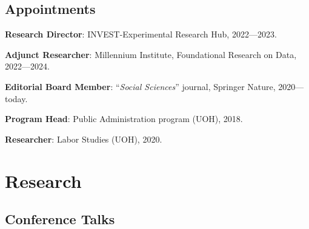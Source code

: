 \documentclass[letterpaper]{article}
\renewenvironment{itemize}{
  \begin{list}{}{
    \setlength{\leftmargin}{1.5em}
  }
}{
  \end{list}
}
\begin{document}
{\unskip}

\subsection*{Appointments}

\begin{itemize}
  \item[\textcolor{gray}{\textbullet}] {\bf Research Director}: INVEST-Experimental Research Hub, 2022---2023.
  \item[\textcolor{gray}{\textbullet}] {\bf Adjunct Researcher}: Millennium Institute, Foundational Research on Data, 2022---2024.
  \item[\textcolor{gray}{\textbullet}] {\bf Editorial Board Member}: ``\emph{Social Sciences}'' journal, Springer Nature, 2020---today.
  \item[\textcolor{gray}{\textbullet}] {\bf Program Head}: Public Administration program (UOH), 2018.
  \item[\textcolor{gray}{\textbullet}] {\bf Researcher}: Labor Studies (UOH), 2020.
\end{itemize}

\section*{Research}
{\unskip}



{}



\subsection*{Conference Talks}

{\unskip}


\end{document}
